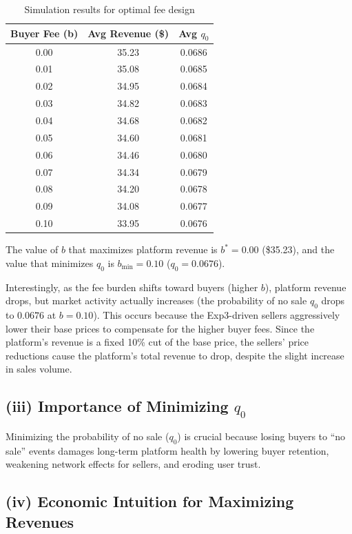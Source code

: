 \documentclass[12pt]{article}
\begin{document}
\begin{table}[H]
\centering
\small
\begin{tabular}{|c|c|c|}
\hline
\textbf{Buyer Fee (b)} & \textbf{Avg Revenue (\$)} & \textbf{Avg $q_0$} \\
\hline
0.00 & 35.23 & 0.0686 \\
0.01 & 35.08 & 0.0685 \\
0.02 & 34.95 & 0.0684 \\
0.03 & 34.82 & 0.0683 \\
0.04 & 34.68 & 0.0682 \\
0.05 & 34.60 & 0.0681 \\
0.06 & 34.46 & 0.0680 \\
0.07 & 34.34 & 0.0679 \\
0.08 & 34.20 & 0.0678 \\
0.09 & 34.08 & 0.0677 \\
0.10 & 33.95 & 0.0676 \\
\hline
\end{tabular}
\caption{Simulation results for optimal fee design}
\label{table:fee_results}
\end{table}

The value of $b$ that maximizes platform revenue is $b^* = 0.00$ (\$35.23), and the value that minimizes $q_0$ is $b_{\min} = 0.10$ ($q_0 = 0.0676$). 

Interestingly, as the fee burden shifts toward buyers (higher $b$), platform revenue drops, but market activity actually increases (the probability of no sale $q_0$ drops to $0.0676$ at $b=0.10$). This occurs because the Exp3-driven sellers aggressively lower their base prices to compensate for the higher buyer fees. Since the platform's revenue is a fixed 10\% cut of the base price, the sellers' price reductions cause the platform's total revenue to drop, despite the slight increase in sales volume.

\subsection*{(iii) Importance of Minimizing $q_0$}

Minimizing the probability of no sale ($q_0$) is crucial because losing buyers to ``no sale'' events damages long-term platform health by lowering buyer retention, weakening network effects for sellers, and eroding user trust.

\subsection*{(iv) Economic Intuition for Maximizing Revenues}
\end{document}
